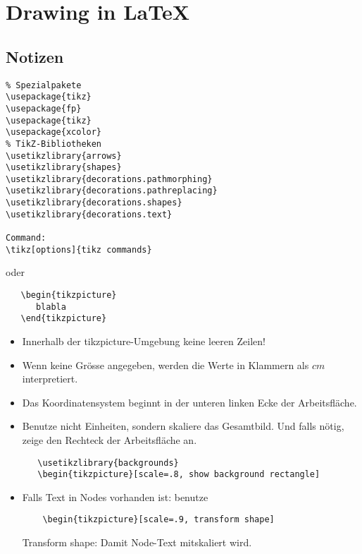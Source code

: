 \documentclass[12pt, a4paper]{scrartcl}
\begin{document}
\section*{Drawing in \LaTeX}
\tableofcontents
\pagebreak

\subsection{Notizen}

\begin{verbatim}
% Spezialpakete
\usepackage{tikz}
\usepackage{fp}
\usepackage{tikz}
\usepackage{xcolor}
% TikZ-Bibliotheken
\usetikzlibrary{arrows}
\usetikzlibrary{shapes}
\usetikzlibrary{decorations.pathmorphing}
\usetikzlibrary{decorations.pathreplacing}
\usetikzlibrary{decorations.shapes}
\usetikzlibrary{decorations.text}

Command:
\tikz[options]{tikz commands}
\end{verbatim}

oder

\begin{verbatim}
   \begin{tikzpicture}
      blabla
   \end{tikzpicture}

\end{verbatim}


\begin{itemize}
   \item Innerhalb der tikzpicture-Umgebung keine leeren Zeilen!
   
   \item Wenn keine Grösse angegeben, werden die Werte in Klammern als $cm$ interpretiert.
   
   \item Das Koordinatensystem beginnt in der unteren linken Ecke der Arbeitsfläche.

   \item Benutze nicht Einheiten, sondern skaliere das Gesamtbild. Und falls nötig, zeige den Rechteck der Arbeitsfläche an.
   \begin{verbatim}
   \usetikzlibrary{backgrounds}
   \begin{tikzpicture}[scale=.8, show background rectangle]
   \end{verbatim}
      
   \item Falls Text in Nodes vorhanden ist: benutze 
   \begin{verbatim}
    \begin{tikzpicture}[scale=.9, transform shape]
    \end{verbatim} Transform shape: Damit Node-Text mitskaliert wird.

\end{itemize}
\end{document}
